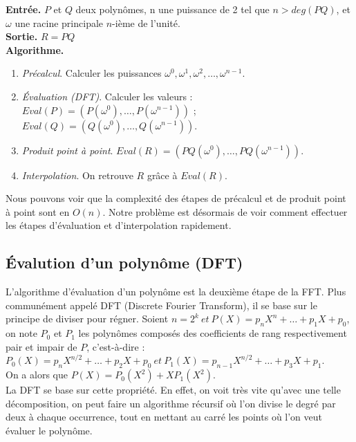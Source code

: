 \documentclass[12pt, a4paper]{article}
\begin{document}
\begin{tcolorbox}[colback=cyan!5!white,
                  colframe=cyan!100!black,
                  title=\textbf{Algorithme de multiplication par la FFT}
                 ]
\textbf{Entrée.} $P$ et $Q$ deux polynômes, n une puissance de 2 tel que $n>deg(PQ)$, et $\omega$ une racine principale $n$-ième de l’unité. \\
\textbf{Sortie.} $R = PQ$ \\
\textbf{Algorithme.}
\begin{enumerate}[itemsep=-2ex]
\item\textit{Précalcul}. Calculer les puissances $\omega^0,\omega^1,\omega^2,\dots,\omega^{n-1}$. \\
\item\textit{Évaluation (DFT)}. Calculer les valeurs : \\ $Eval(P)=(P(\omega^0),\dots,P(\omega^{n-1}))$ ; $Eval(Q)=(Q(\omega^0),\dots,Q(\omega^{n-1}))$. \\
\item\textit{Produit point à point}. $Eval(R) = (PQ(\omega^0),\dots,PQ(\omega^{n-1}))$. \\
\item\textit{Interpolation}. On retrouve $R$ grâce à $Eval(R)$.
\end{enumerate}
\end{tcolorbox}
Nous pouvons voir que la complexité des étapes de précalcul et de produit point à point sont en $O(n)$. Notre problème est désormais de voir comment effectuer les étapes d'évaluation et d'interpolation rapidement.

\subsection{Évalution d'un polynôme (DFT)}

L'algorithme d'évaluation d'un polynôme est la deuxième étape de la FFT. Plus communément appelé DFT (Discrete Fourier Transform), il se base sur le principe de diviser pour régner.
Soient $n = 2^k\ et\ P(X) = p_n X^n +\dots+p_1 X + p_0$, on note $P_0$ et $P_1$ les polynômes composés des coefficients de rang respectivement pair et impair de $P$, c'est-à-dire : \\
$P_0(X) = p_{n} X^{n/2} +\dots+ p_2 X + p_0\ et\ P_1(X) = p_{n-1} X^{n/2} +\dots+ p_3 X + p_1$. \\
On a alors que $P(X) = P_0(X^2)+X P_1(X^2)$. \\
La DFT se base sur cette propriété. En effet, on voit très vite qu'avec une telle décomposition, on peut faire un algorithme récursif où l'on divise le degré par deux à chaque occurrence, tout en mettant au carré les points où l'on veut évaluer le polynôme.
\end{document}
